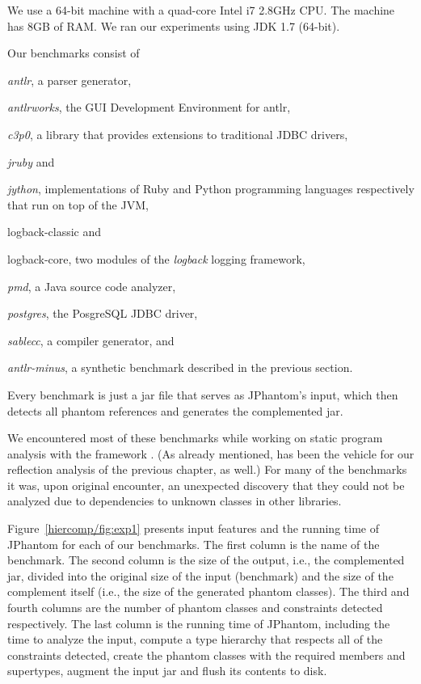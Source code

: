 We use a 64-bit machine with a quad-core Intel i7 2.8GHz CPU. The
machine has 8GB of RAM. We ran our experiments using JDK 1.7
(64-bit).

Our benchmarks consist of
\begin{inparaenum}[(1)]
\item \emph{antlr}, a parser generator,
\item \emph{antlrworks}, the GUI Development Environment for antlr,
\item \emph{c3p0}, a library that provides extensions to traditional
  JDBC drivers,
\item \emph{jruby} and
\item \emph{jython}, implementations of Ruby and Python programming
  languages respectively that run on top of the JVM,
\item logback-classic and
\item logback-core, two modules of the \emph{logback} logging
  framework,
\item \emph{pmd}, a Java source code analyzer,
\item \emph{postgres}, the PosgreSQL JDBC driver,
\item \emph{sablecc}, a compiler generator, and
\item \emph{antlr-minus}, a synthetic benchmark described in the
  previous section.
\end{inparaenum}
Every benchmark is just a jar file that serves as JPhantom's
input, which then detects all phantom references and generates the
complemented jar.

We encountered most of these benchmarks while working on static
program analysis with the \doop{} framework
\cite{oopsla/BravenboerS09,pldi/KastrinisS13}. (As already mentioned,
\doop{} has been the vehicle for our reflection analysis of the
previous chapter, as well.) For many of the benchmarks it was, upon
original encounter, an unexpected discovery that they could not be
analyzed due to dependencies to unknown classes in other libraries.

Figure~\ref{hiercomp/fig:exp1} presents input features and the running time of
JPhantom for each of our benchmarks. The first column is the name of
the benchmark. The second column is the size of the output, i.e., the
complemented jar, divided into the original size of the input
(benchmark) and the size of the complement itself (i.e., the size of
the generated phantom classes). The third and fourth columns are the
number of phantom classes and constraints detected respectively. The
last column is the running time of JPhantom, including the time to
analyze the input, compute a type hierarchy that respects all of the
constraints detected, create the phantom classes with the required
members and supertypes, augment the input jar and flush its contents
to disk.

